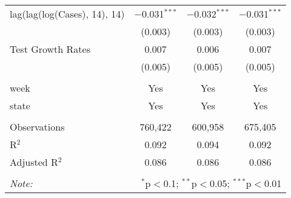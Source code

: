 \begin{tabular}{@{\extracolsep{1pt}}lccc}
  lag(lag(log(Cases), 14), 14) & $-$0.031$^{***}$ & $-$0.032$^{***}$ & $-$0.031$^{***}$ \\ 
  & (0.003) & (0.003) & (0.003) \\ 
  Test Growth Rates & 0.007 & 0.006 & 0.007 \\ 
  & (0.005) & (0.005) & (0.005) \\ 
 \hline \\[-1.8ex] 
week & Yes & Yes & Yes \\ 
state & Yes & Yes & Yes \\ 
\hline \\[-1.8ex] 
Observations & 760,422 & 600,958 & 675,405 \\ 
R$^{2}$ & 0.092 & 0.094 & 0.092 \\ 
Adjusted R$^{2}$ & 0.086 & 0.086 & 0.086 \\ 
\hline 
\hline \\[-1.8ex] 
\textit{Note:}  & \multicolumn{3}{r}{$^{*}$p$<$0.1; $^{**}$p$<$0.05; $^{***}$p$<$0.01} \\ 
\end{tabular} 